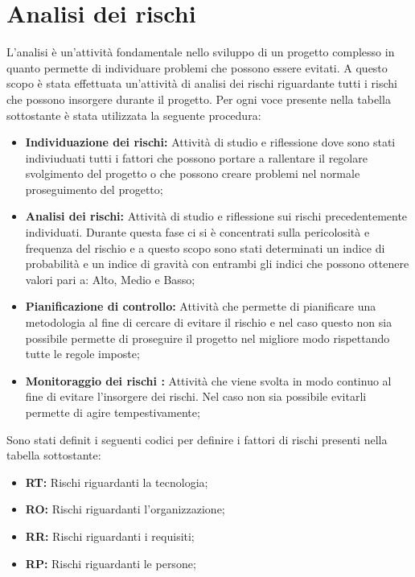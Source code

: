 \section{Analisi dei rischi}
L'analisi è un'attività fondamentale nello sviluppo di un progetto complesso in quanto permette di individuare problemi che possono essere evitati.
A questo scopo è stata effettuata un'attività di analisi dei rischi riguardante tutti i rischi che possono insorgere durante il progetto.
Per ogni voce presente nella tabella sottostante è stata utilizzata la seguente procedura:
\begin{itemize}
	\item \textbf{Individuazione dei rischi:} Attività di studio e riflessione dove sono stati indiviuduati tutti i fattori che possono portare a rallentare il regolare svolgimento del progetto o che possono creare problemi nel normale proseguimento del progetto; \\
	\item \textbf{Analisi dei rischi:} Attività di studio e riflessione sui rischi precedentemente individuati. Durante questa fase ci si è concentrati sulla pericolosità e frequenza del rischio e a questo scopo sono stati determinati un indice di probabilità e un indice di gravità con entrambi gli indici che possono ottenere valori pari a: Alto, Medio e Basso; \\
	\item \textbf{Pianificazione di controllo:} Attività che permette di pianificare una metodologia al fine di cercare di evitare il rischio e nel caso questo non sia possibile permette di proseguire il progetto nel migliore modo rispettando tutte le regole imposte; \\
	\item \textbf{Monitoraggio dei rischi :} Attività che viene svolta in modo continuo al fine di evitare l'insorgere dei rischi. Nel caso non sia possibile evitarli permette di agire tempestivamente; \\
\end{itemize}
Sono stati definit i seguenti codici per definire i fattori di rischi presenti nella tabella sottostante:
\begin{itemize}
	\item \textbf{RT:} Rischi riguardanti la tecnologia;
	\item \textbf{RO:} Rischi riguardanti l'organizzazione;
	\item \textbf{RR:} Rischi riguardanti i requisiti;
	\item \textbf{RP:} Rischi riguardanti le persone;
\end{itemize}
